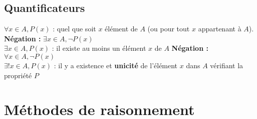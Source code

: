     \subsection{Quantificateurs}\label{subsec:quantificateurs}
      
      $\forall x \in A, P(x)$ : quel que soit $x$ élément de $A$ (ou pour tout $x$ appartenant à $A$). \hfill \textbf{Négation :} $\exists x \in A, \neg P(x)$\\
      $\exists x \in A, P(x)$ : il existe au moins un élément $x$ de $A$ \hfill \textbf{Négation :} $\forall x \in A, \neg P(x)$\\
      $\exists !x \in A, P(x)$ : il y a existence et \textbf{unicité} de l'élément $x$ dans $A$ vérifiant la propriété $P$
  
  
  \section{Méthodes de raisonnement}\label{sec:methodes-de-raisonnement}
    
